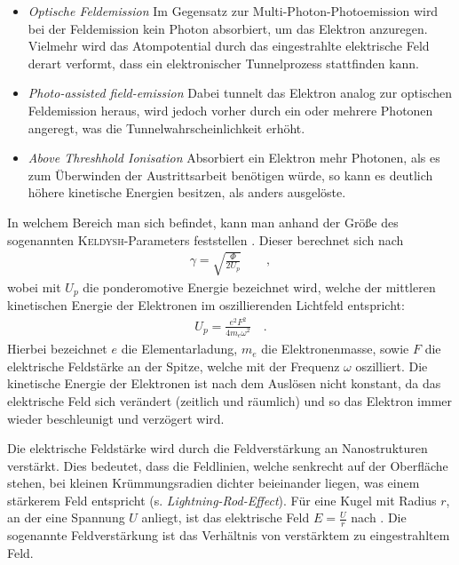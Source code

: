 \documentclass[bachelor,       %
               twoside,        %
               BCOR10mm,       %
               english,ngerman, %
               ]{GAUBM}
\begin{document}
\begin{itemize}
	\item \textit{Optische Feldemission}
	Im Gegensatz zur Multi-Photon-Photoemission wird bei der Feldemission kein Photon absorbiert, um das Elektron anzuregen.
	Vielmehr wird das Atompotential durch das eingestrahlte elektrische Feld derart verformt, dass ein elektronischer Tunnelprozess stattfinden kann.
	
	\item \textit{Photo-assisted field-emission} Dabei tunnelt das Elektron analog zur optischen Feldemission heraus, wird jedoch vorher durch ein oder mehrere Photonen angeregt, was die Tunnelwahrscheinlichkeit erhöht.
	
	\item \textit{Above Threshhold Ionisation}
	Absorbiert ein Elektron mehr Photonen, als es zum Überwinden der Austrittsarbeit benötigen würde, so kann es deutlich höhere kinetische Energien besitzen, als anders ausgelöste.
	
\end{itemize}
In welchem Bereich man sich befindet, kann man anhand der Größe des sogenannten \textsc{Keldysh}-Parameters feststellen \cite{keldysh1965}.
Dieser berechnet sich nach
\begin{align}
	\gamma=\sqrt{\frac{\Phi}{2U_p}}\qquad ,
	\label{eq:keldysh}
\end{align}
wobei mit $U_{p}$ die ponderomotive Energie bezeichnet wird, welche der mittleren kinetischen Energie der Elektronen im oszillierenden Lichtfeld entspricht:
\begin{align}
	U_p=\frac{e^2F^2}{4m_e\omega^2} \quad .
	\label{eq:ponderomotiv}
\end{align}
Hierbei bezeichnet $e$ die Elementarladung, $m_e$ die Elektronenmasse, sowie $F$ die elektrische Feldstärke an der Spitze, welche mit der Frequenz $\omega$ oszilliert.
Die kinetische Energie der Elektronen ist nach dem Auslösen nicht konstant, da das elektrische Feld sich verändert (zeitlich und räumlich) und so das Elektron immer wieder beschleunigt und verzögert wird.

Die elektrische Feldst\"arke wird durch die Feldverst\"arkung an Nanostrukturen verst\"arkt.
Dies bedeutet, dass die Feldlinien, welche senkrecht auf der Oberfläche stehen, bei kleinen Krümmungsradien dichter beieinander liegen, was einem st\"arkerem Feld entspricht (s. \textit{Lightning-Rod-Effect}).
Für eine Kugel mit Radius $r$, an der eine Spannung $U$ anliegt, ist das elektrische Feld $E=\frac{U}{r}$ nach \cite{feldverstaerkung}.
Die sogenannte Feldverstärkung ist das Verhältnis von verstärktem zu eingestrahltem Feld.
\end{document}
